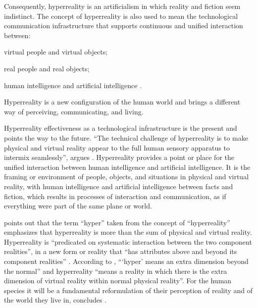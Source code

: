 \documentclass[english]{textolivre}
\begin{document}
Consequently, hyperreality is an artificialism in which reality and fiction seem indistinct. The concept of hyperreality is also used to mean the technological communication infrastructure that supports continuous and unified interaction between:
\begin{enumerate*}[label=\roman*)]
\item virtual people and virtual objects; 
\item real people and real objects;
\item human intelligence and artificial intelligence \cite[p.~380]{barroso_contributions_2020}.
\end{enumerate*}
Hyperreality is a new configuration of the human world and brings a different way of perceiving, communicating, and living.

Hyperreality effectiveness as a technological infrastructure is the present and points the way to the future. “The technical challenge of hyperreality is to make physical and virtual reality appear to the full human sensory apparatus to intermix seamlessly”, argues \textcite[p.~7]{terashima_definition_2005}. Hyperreality provides a point or place for the unified interaction between human intelligence and artificial intelligence. It is the framing or environment of people, objects, and situations in physical and virtual reality, with human intelligence and artificial intelligence between facts and fiction, which results in processes of interaction and communication, as if everything were part of the same plane or world.

\textcite{terashima_definition_2005} points out that the term “hyper” taken from the concept of “hyperreality” emphasizes that hyperreality is more than the sum of physical and virtual reality. Hyperreality is “predicated on systematic interaction between the two component realities”, in a new form or reality that “has attributes above and beyond its component realities” \cite[p.~12]{terashima_definition_2005}. According to \textcite[p.~41]{tiffin_hyperreality_2005}, “‘hyper’ means an extra dimension beyond the normal” and hyperreality “means a reality in which there is the extra dimension of virtual reality within normal physical reality”. For the human species it will be a fundamental reformulation of their perception of reality and of the world they live in, concludes \textcite{tiffin_hyperreality_2005}.
\end{document}
